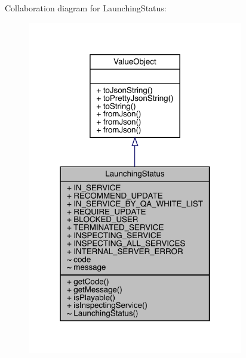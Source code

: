 Collaboration diagram for Launching\+Status\+:\nopagebreak
\begin{figure}[H]
\begin{center}
\leavevmode
\includegraphics[width=267pt]{classcom_1_1toast_1_1android_1_1gamebase_1_1launching_1_1data_1_1_launching_status__coll__graph}
\end{center}
\end{figure}
